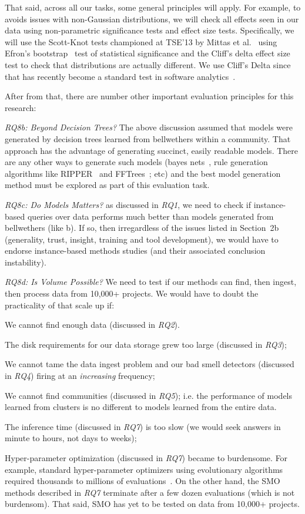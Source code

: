 That said, across all our tasks, some general principles will apply.
For example, 
to avoids issues with non-Gaussian
distributions, we will check all effects seen in our data using
 non-parametric significance tests and effect size tests. Specifically,
 we will use the Scott-Knot tests championed at TSE'13 by 
 Mittas et al.~\cite{Mittas13} using Efron's bootstrap~\cite{efron93} test of statistical significance and the Cliff's
delta effect size test to check that distributions are actually different. We use Cliff's Delta since that has
recently become a standard test in software analytics~\cite{Gh15}.

After from that, there are number other important evaluation principles for this research:

{\em RQ8b: Beyond Decision Trees?}
The above discussion assumed that models were generated by decision trees learned from bellwethers within a community. That approach has the advantage of generating succinct, easily readable models.  There are any other ways to generate such models (bayes nets~\cite{misirli2014bayesian}, 
rule generation algorithms like RIPPER~\cite{cohen1999simple} and FFTrees~\cite{chen2018applications}; etc) and the best model generation method
must be explored as part of this evaluation task.

{\em RQ8c: Do Models Matters?} as discussed in {\em RQ1}, we need to check if  instance-based queries   over data performs much better
than models generated from bellwethers (like b).
If so, then   irregardless of the  issues listed in Section~2b (generality,
trust, insight, training and tool development), we would have to endorse
instance-based methods studies (and their associated conclusion instability).

{\em RQ8d: Is Volume Possible?} We need to test if our methods
can find, then ingest, then process data from  10,000+ projects. We would have to doubt the practicality of that scale up if:
\bi
\item We cannot find enough data (discussed in {\em RQ2}).
\item The disk requirements for our data storage grew too large (discussed in {\em RQ3}); 
\item We cannot tame the  data ingest problem and our
  bad smell detectors (discussed in {\em RQ4})    firing at an {\em increasing} frequency;
\item We cannot find communities (discussed in {\em RQ5}); i.e. the performance of  models learned from  clusters
 is no different to models learned from the entire data.
 \item The inference time (discussed in {\em RQ7}) is too slow (we would seek answers in minute to hours, not days to weeks);
\item Hyper-parameter optimization (discussed in {\em RQ7}) became to burdensome.
For example, standard hyper-parameter optimizers using evolutionary
algorithms required thousands to millions of evaluations~\cite{sarro2016multi}. 
On the other hand,
the SMO methods described in {\em RQ7} terminate after a few dozen evaluations (which is not burdensom). That said, SMO has yet to be    tested on data from 10,000+ projects.

